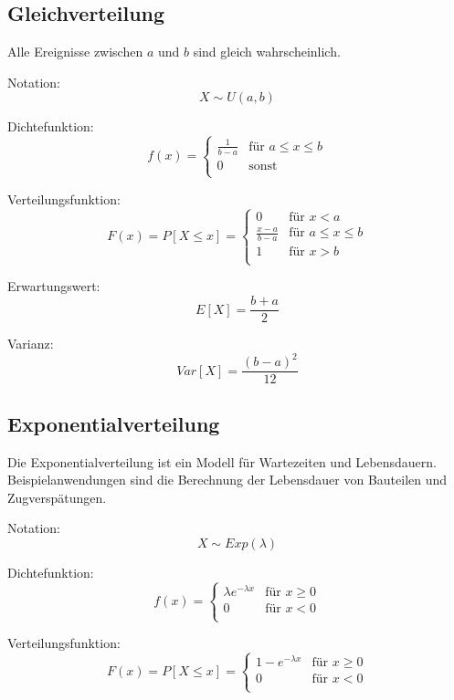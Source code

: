 \documentclass[10pt,a4paper,twocolumn]{article}
\begin{document}
\subsection{Gleichverteilung}
Alle Ereignisse zwischen $a$ und $b$ sind gleich wahrscheinlich.

\vspace{10pt}

Notation:
\[
X \sim U(a,b)
\]

Dichtefunktion:
\[
f(x)=
\begin{cases}
	\frac{1}{b-a} & \text{für $a \leq x \leq b$} \\
	0 & \text{sonst} \\
\end{cases} 
\]

Verteilungsfunktion:
\[
F(x)=P[X \leq x]=
\begin{cases}
	0 & \text{für $x < a$} \\	
	\frac{x-a}{b-a} & \text{für $a \leq x \leq b$} \\
	1 & \text{für $x > b$} \\
\end{cases} 
\]

Erwartungswert:
\[
E[X]=\frac{b+a}{2}
\]

Varianz:
\[
Var[X]=\frac{(b-a)^2}{12}
\]

\subsection{Exponentialverteilung}
Die Exponentialverteilung ist ein Modell für Wartezeiten und Lebensdauern. Beispielanwendungen sind die Berechnung der Lebensdauer von Bauteilen und Zugverspätungen.

\vspace{10pt}

Notation:
\[
X \sim Exp(\lambda)
\]

Dichtefunktion:
\[
f(x)=
\begin{cases}
	\lambda e^{- \lambda x} & \text{für $x \geq 0$} \\
	0 & \text{für $x < 0$} \\
\end{cases} 
\]

Verteilungsfunktion:
\[
F(x)=P[X \leq x]=
\begin{cases}
	1-e^{- \lambda x} & \text{für $x \geq 0$} \\	
	0 & \text{für $x < 0$} \\
\end{cases} 
\]
\end{document}

